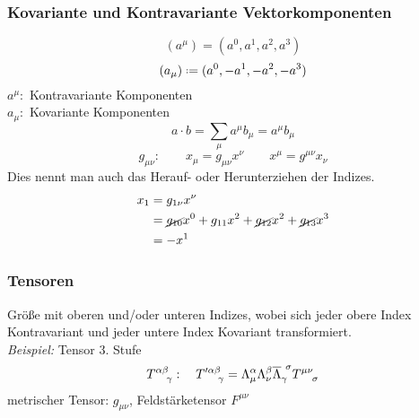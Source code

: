 \subsubsection{Kovariante und Kontravariante Vektorkomponenten}

\begin{equation*}
(a^{\mu}) = (a^0, a^1, a^2, a^3)
\end{equation*}
\begin{equation*}
(a_{\mu}) \defeq (a^0, -a^1, -a^2, -a^3)
\end{equation*}
$ a^{\mu} : $ Kontravariante Komponenten\\
$ a_{\mu} : $ Kovariante Komponenten
\begin{equation*}
a \cdot b = \sum_{\mu} a^{\mu} b_{\mu} = a^{\mu} b_{\mu}
\end{equation*}
$$ g_{\mu \nu} : \qquad x_{\mu} = g_{\mu \nu} x^{\nu} \qquad x^{\mu} = g^{\mu \nu} x_{\nu} $$
Dies nennt man auch das Herauf- oder Herunterziehen der Indizes.
\begin{align*}
x_1 &= g_{1 \nu} x^\nu\\
&= \cancel{g_{10}}x^0 + g_{11} x^2 + \cancel{g_{12}}x^2 + \cancel{g_{13}}x^3\\
&= - x^1
\end{align*}

\subsubsection{Tensoren}

Größe mit oberen und/oder unteren Indizes, wobei sich jeder obere Index Kontravariant und jeder untere Index Kovariant transformiert.\\[5pt]
\emph{Beispiel:} Tensor 3. Stufe
$$ T^{\alpha \beta}_{\ \ \ \gamma} : \quad T'^{\alpha \beta}_{\ \ \ \: \gamma} = \Lambda^{\alpha}_{\mu} \Lambda^{\beta}_{\nu} \ol{\Lambda}_{\gamma} ^{\ \sigma} T^{\mu \nu}_{\ \ \ \sigma} $$
metrischer Tensor: $ g_{\mu \nu} $, Feldstärketensor $ F^{\mu \nu} $
